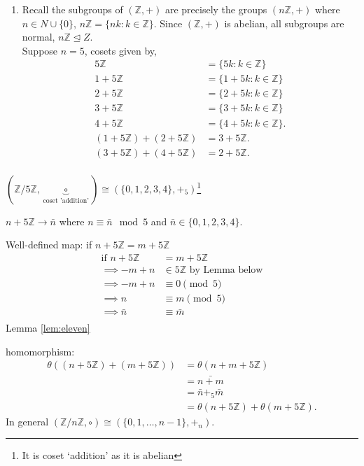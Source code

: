 \begin{example}
\begin{enumerate}
\def\labelenumi{\roman{enumi}.}
\setcounter{enumi}{2}
\tightlist
\item
  Recall the subgroups of \((\mathbb{Z}, +)\) are precisely the groups \((n \mathbb{Z}, +)\) where \(n \in N \cup \{ 0 \}\), \(n \mathbb{Z} = \{ nk : k \in \mathbb{Z} \}\).
  Since \((\mathbb{Z}, +)\) is abelian, all subgroups are normal, \(n \mathbb{Z} \trianglelefteq Z\).\\
  Suppose \(n = 5\), cosets given by,
  \begin{align*}
      5 \mathbb{Z} &= \{ 5k : k \in \mathbb{Z} \} \\
      1 + 5 \mathbb{Z} &= \{ 1 + 5k : k \in \mathbb{Z} \} \\
      2 + 5 \mathbb{Z} &= \{ 2 + 5k : k \in \mathbb{Z} \} \\
      3 + 5 \mathbb{Z} &= \{ 3 + 5k : k \in \mathbb{Z} \} \\
      4 + 5 \mathbb{Z} &= \{ 4 + 5k : k \in \mathbb{Z} \}. \\
      (1 + 5 \mathbb{Z}) + (2 + 5 \mathbb{Z}) &= 3 + 5 \mathbb{Z}. \\
      (3 + 5 \mathbb{Z}) + (4 + 5 \mathbb{Z}) &= 2 + 5 \mathbb{Z}. \\
  \end{align*}
\end{enumerate}

\(( \mathbb{Z} / 5 \mathbb{Z}, \underbrace{\circ}_\text{coset 'addition'}) \cong \left( \{ 0, 1, 2, 3, 4 \}, +_5 \right)\)\footnote{It is coset `addition' as it is abelian}

\(n + 5 \mathbb{Z} \to \bar{n}\) where \(n \equiv \bar{n} \mod 5\) and \(\bar{n} \in \{ 0, 1, 2, 3, 4 \}\).

Well-defined map:
if \(n + 5 \mathbb{Z} = m + 5 \mathbb{Z}\)
\begin{align*}
    \text{if } n + 5 \mathbb{Z} &= m + 5 \mathbb{Z} \\
    \implies - m + n &\in 5 \mathbb{Z} \text{ by Lemma below} \\
    \implies - m + n &\equiv 0 \pmod 5 \\
    \implies n &\equiv m \pmod 5 \\
    \implies \bar{n} &\equiv \bar{m} \\
\end{align*} Lemma \ref{lem:eleven}

homomorphism:
\begin{align*}
    \theta\left( (n + 5 \mathbb{Z}) + (m + 5 \mathbb{Z}) \right) &= \theta( n + m + 5 \mathbb{Z}) \\
    &= \bar{n + m} \\
    &= \bar{n} +_5 \bar{m} \\
    &= \theta(n + 5 \mathbb{Z}) + \theta(m + 5 \mathbb{Z}).
\end{align*}
In general \((\mathbb{Z} / n \mathbb{Z}, \circ) \cong \left( \{ 0, 1, \ldots, n - 1 \}, +_n \right)\).
\end{example}

